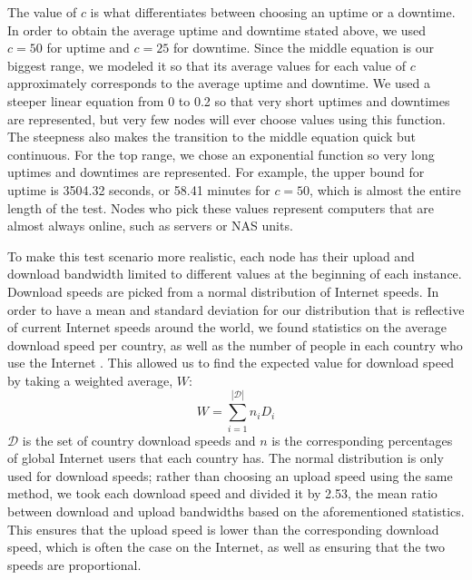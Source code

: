 \documentclass[12pt]{report}
\begin{document}
The value of $c$ is what differentiates between choosing an uptime or a downtime. In order to obtain the average uptime and downtime stated above, we used $c=50$ for uptime and $c=25$ for downtime. Since the middle equation is our biggest range, we modeled it so that its average values for each value of $c$ approximately corresponds to the average uptime and downtime. We used a steeper linear equation from 0 to 0.2 so that very short uptimes and downtimes are represented, but very few nodes will ever choose values using this function. The steepness also makes the transition to the middle equation quick but continuous. For the top range, we chose an exponential function so very long uptimes and downtimes are represented. For example, the upper bound for uptime is 3504.32 seconds, or 58.41 minutes for $c=50$, which is almost the entire length of the test. Nodes who pick these values represent computers that are almost always online, such as servers or NAS units.

To make this test scenario more realistic, each node has their upload and download bandwidth limited to different values at the beginning of each instance. Download speeds are picked from a normal distribution of Internet speeds. In order to have a mean and standard deviation for our distribution that is reflective of current Internet speeds around the world, we found statistics on the average download speed per country, as well as the number of people in each country who use the Internet \cite{internetUsersByCountry,downloadSpeedsByCountry}. This allowed us to find the expected value for download speed by taking a weighted average, $W$:
$$
W=\sum\limits_{i=1}^{|\mathcal{D}|} n_iD_i
$$
$\mathcal{D}$ is the set of country download speeds and $n$ is the corresponding percentages of global Internet users that each country has. The normal distribution is only used for download speeds; rather than choosing an upload speed using the same method, we took each download speed and divided it by 2.53, the mean ratio between download and upload bandwidths based on the aforementioned statistics. This ensures that the upload speed is lower than the corresponding download speed, which is often the case on the Internet, as well as ensuring that the two speeds are proportional.

\end{document}
